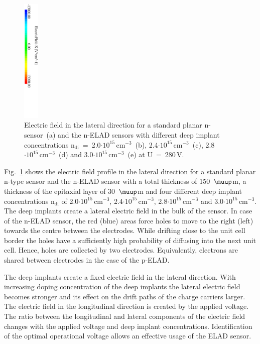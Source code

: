 \documentclass[a4paper,11pt]{article}
\begin{document}
\begin{figure}[t!]
  \includegraphics[trim=-40 120 0 0, height=6cm]{figures/elfleg.pdf}
  \caption{
Electric field in the lateral direction for a standard planar n-sensor~(a) and the n-ELAD sensors with different deep implant concentrations $\mathrm{n_{di}}$~=~2.0$\mathrm{\cdot10^{15}\,cm^{-3}}$~(b),
 2.4$\mathrm{\cdot10^{15}\,cm^{-3}}$~(c), 2.8$\mathrm{\cdot10^{15}\,cm^{-3}}$~(d) and 3.0$\mathrm{\cdot10^{15}\,cm^{-3}}$~(e) at U~=~280\,V.
}
  \label{fig:ef}
\end{figure}

Fig.~\ref{fig:ef} shows the electric field profile in the lateral direction for a standard planar n-type sensor and the n-ELAD sensor with a total thickness of 150~$\muup$m, a thickness of the epitaxial layer of 30~$\muup$m and four different deep implant concentrations $\mathrm{n_{di}}$ of 2.0$\mathrm{\cdot10^{15}\,cm^{-3}}$, 2.4$\mathrm{\cdot10^{15}\,cm^{-3}}$, 2.8$\mathrm{\cdot10^{15}\,cm^{-3}}$ and 3.0$\mathrm{\cdot10^{15}\,cm^{-3}}$.
The deep implants create a lateral electric field in the bulk of the sensor.
In case of the n-ELAD sensor, the red (blue) areas force holes to move to the right (left) towards the centre between the electrodes.
While drifting close to the unit cell border the holes have a sufficiently high probability of diffusing into the next unit cell.
Hence, holes are collected by two electrodes.
Equivalently, electrons are shared between electrodes in the case of the p-ELAD.

The deep implants create a fixed electric field in the lateral direction. 
With increasing doping concentration of the deep implants the lateral electric field becomes stronger and its effect on the drift paths of the charge carriers larger.
The electric field in the longitudinal direction is created by the applied voltage. 
The ratio between the longitudinal and lateral components of the electric field changes with the applied voltage and deep implant concentrations.
Identification of the optimal operational voltage allows an effective usage of the ELAD sensor.
\end{document}
